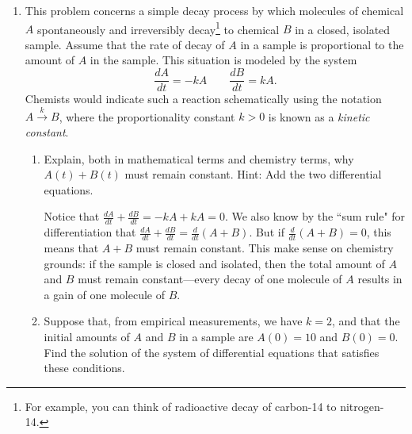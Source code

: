 \documentclass[main]{subfiles}
\begin{document}
\begin{enumerate}

  

\item   \label{reaction-irreversible}


This problem concerns a simple decay process by which molecules of chemical $A$
spontaneously and irreversibly decay\footnote{For example, you can think of
radioactive decay of carbon-14 to nitrogen-14.} to chemical $B$ in
a closed, isolated sample.
Assume that the rate of decay of $A$ in a sample is proportional to the amount
of $A$ in the sample.  This situation is modeled by the system
$$
  \frac{dA}{dt} = -kA \qquad \frac{dB}{dt} = kA.
$$ 
Chemists would indicate such a reaction schematically using
the notation $A \xrightarrow{k} B$, where the proportionality constant $k > 0$ is
known as a {\em kinetic constant}.

\begin{enumerate}

  \item
  \begin{problem}[1in]
    Explain, both in mathematical terms and chemistry terms, why $A(t) + B(t)$ must
    remain constant.  Hint:  Add the two differential equations.
  \end{problem}

  \begin{solution}
    Notice that $\displaystyle \frac{dA}{dt} + \frac{dB}{dt} = -kA + kA = 0$.  We also
    know by the ``sum rule" for differentiation that 
    $\displaystyle \frac{dA}{dt} + \frac{dB}{dt} = \frac{d}{dt} (A + B)$.  But if
    $\displaystyle \frac{d}{dt} (A + B) = 0$, this means that $A + B$ must remain constant.
    This make sense on chemistry grounds:  if the sample is closed and isolated, then
    the total amount of $A$ and $B$ must remain constant---every decay of one
    molecule of $A$ results in a gain of one molecule of $B$.
  \end{solution}

  \item
  \begin{problem}[1in]
    Suppose that, from empirical measurements, we have $k = 2$, and that the initial
    amounts of $A$ and $B$ in a sample are $A(0) = 10$ and $B(0) = 0$.  Find the solution
    of the system of differential equations that satisfies these conditions. 
  \end{problem}


\end{enumerate}
\end{enumerate}
\end{document}
